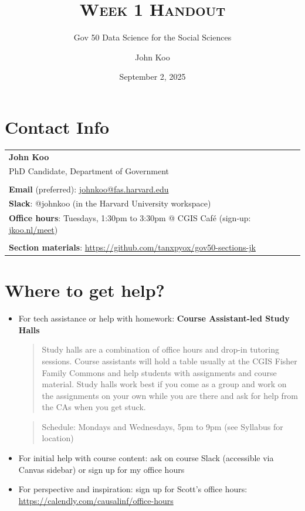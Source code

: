 \documentclass[
  11pt,
  letterpaper]{article}
\title{\textsc{Week 1 Handout}}
\subtitle{Gov 50 Data Science for the Social Sciences}
\author{John Koo}
\date{September 2, 2025}
\begin{document}
\maketitle

\section{Contact Info}\label{contact-info}

\begin{table}[!h]

\centering

\begin{tabular}{l}
  \textbf{John Koo} \\
  PhD Candidate, Department of Government \\ \\
  
  \textbf{Email} (preferred): \href{mailto:johnkoo@fas.harvard.edu}{johnkoo@fas.harvard.edu} \\
  \textbf{Slack}: @johnkoo (in the Harvard University workspace) \\
  \textbf{Office hours}: Tuesdays, 1:30pm to 3:30pm @ CGIS Caf\'e (sign-up: \href{https://jkoo.nl/meet}{jkoo.nl/meet}) \\ \\ 
  \textbf{Section materials}: \url{https://github.com/tanxpyox/gov50-sections-jk}
  
  \end{tabular}
\end{table}

\section{Where to get help?}\label{where-to-get-help}

\begin{itemize}
\item
  For tech assistance or help with homework: \textbf{Course
  Assistant-led Study Halls}

  \begin{quote}
  Study halls are a combination of office hours and drop-in tutoring
  sessions. Course assistants will hold a table usually at the CGIS
  Fisher Family Commons and help students with assignments and course
  material. Study halls work best if you come as a group and work on the
  assignments on your own while you are there and ask for help from the
  CAs when you get stuck.
  \end{quote}

  \begin{quote}
  Schedule: Mondays and Wednesdays, 5pm to 9pm (see Syllabus for
  location)
  \end{quote}
\item
  For initial help with course content: ask on course Slack (accessible
  via Canvas sidebar) or sign up for my office hours
\item
  For perspective and inspiration: sign up for Scott's office hours:
  \url{https://calendly.com/causalinf/office-hours}
\end{itemize}
\end{document}
